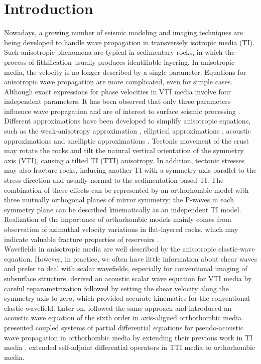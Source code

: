 \section{Introduction}
Nowadays, a growing number of seismic modeling and imaging techniques
are being developed to handle wave propagation in transversely isotropic
media (TI).  Such anisotropic phenomena are typical in sedimentary
rocks, in which the process of lithification usually produces
identifiable layering.  
In anisotropic media, the velocity is no longer described by a single parameter.
Equations for anisotropic wave propagation are more complicated, even for simple cases.
Although exact expressions for phase velocities in VTI media involve four independent parameters,
It has been observed that only three parameters influence wave propagation and are of interest
to surface seismic processing \cite[]{alkhalifah}.
Different approximations have been developed to simplify anisotropic equations, such as the weak-anisotropy
approximation \cite[]{thomsen}, elliptical approximations \cite[]{helbig,dell1}, acoustic approximations \cite[]{alkhalifah1,alkhalifah2} and anelliptic approximations \cite[]{dell2,muir,anelliptic}.
Tectonic movement of the crust may rotate the
rocks and tilt the natural vertical orientation 
of the symmetry axis
(VTI), causing a tilted TI (TTI) anisotropy.  
In addition, tectonic
stresses may also fracture rocks, inducing another TI with a symmetry
axis parallel to the stress direction and usually normal to the
sedimentation-based TI.  The combination of these effects can be
represented by an orthorhombic model with three mutually
orthogonal planes of mirror symmetry; 
the P-waves in each symmetry plane can be described kinematically as an independent TI model.
Realization of the importance of
orthorhombic models mainly comes from observation of azimuthal velocity variations in flat-layered rocks, which may
indicate valuable fracture properties of reservoirs \cite[]{grechka}.\\

Wavefields in anisotropic media are well described by the aniso\-tropic
elastic-wave equation.  However, in practice, we often have little
information about shear waves and prefer to deal with
scalar wavefields, especially for conventional imaging 
of subsurface structure.
\cite{alkhalifah2} derived
an acoustic scalar wave equation for VTI media
by careful reparametrization followed by setting the shear velocity along the symmetry axis to zero,
which provided accurate kinematics for the
conventional elastic wavefield.  
Later on, \cite{alkaor} followed the
same approach and introduced an acoustic wave equation of the sixth order
in axis-aligned orthorhombic media.  
\cite{fowleror} presented coupled
systems of partial differential equations for pseudo-acoustic
wave propagation in orthorhombic media by extending their previous
work in TI media \cite[]{fowler}.  
\cite{zhangor} extended 
self-adjoint differential operators in TTI media \cite[]{duveneck,zhangtti} 
to orthorhombic media.\\

